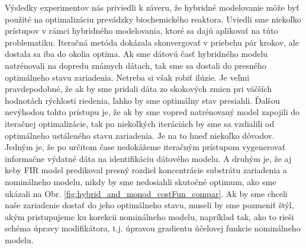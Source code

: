 Výsledky experimentov nás priviedli k záveru, že hybridné modelovanie môže byť použité na optimalizáciu prevádzky biochemického reaktora. Uviedli sme niekoľko prístupov v rámci hybridného modelovania, ktoré sa dajú aplikovať na túto problematiku. Iteračná metóda dokázala skonvergovať v priebehu pár krokov, ale dostala sa iba do okolia optima. Ak sme dátovú časť hybridného modelu natrénovali na dopredu známych dátach, tak sme sa dostali do presného optimálneho stavu zariadenia.
Netreba si však robiť ilúzie. Je veľmi pravdepodobné, že ak by sme pridali dáta zo skokových zmien pri väčších hodnotách rýchlosti riedenia, ľahko by sme optimálny stav presiahli. Ďalšou nevýhodou tohto prístupu je, že ak by sme vopred natrénovaný model zapojili do iteračnej optimalizácie, tak po niekoľkých iteráciách by sme sa vzdialili od optimálneho ustáleného stavu zariadenia. Je na to hneď niekoľko dôvodov. Jedným je, že po určitom čase nedokážeme iteračným prístupom vygenerovať informačne výdatné dáta na identifikáciu dátového modelu. A druhým je, že aj keby FIR model predikoval presný rozdiel koncentrácie substrátu zariadenia a nominálneho modelu, nikdy by sme nedosiahli skutočné optimum, ako sme ukázali na Obr. \ref{fig:hybrid_and_monod_costFun_compar}. Ak by sme chceli naše zariadenie dostať do jeho optimálneho stavu, museli by sme pozmeniť štýl, akým pristupujeme ku korekcii nominálneho modelu, napríklad tak, ako to rieši schéma úpravy modifikátora, t.j. úpravou gradientu účelovej funkcie nominálneho modelu. 
